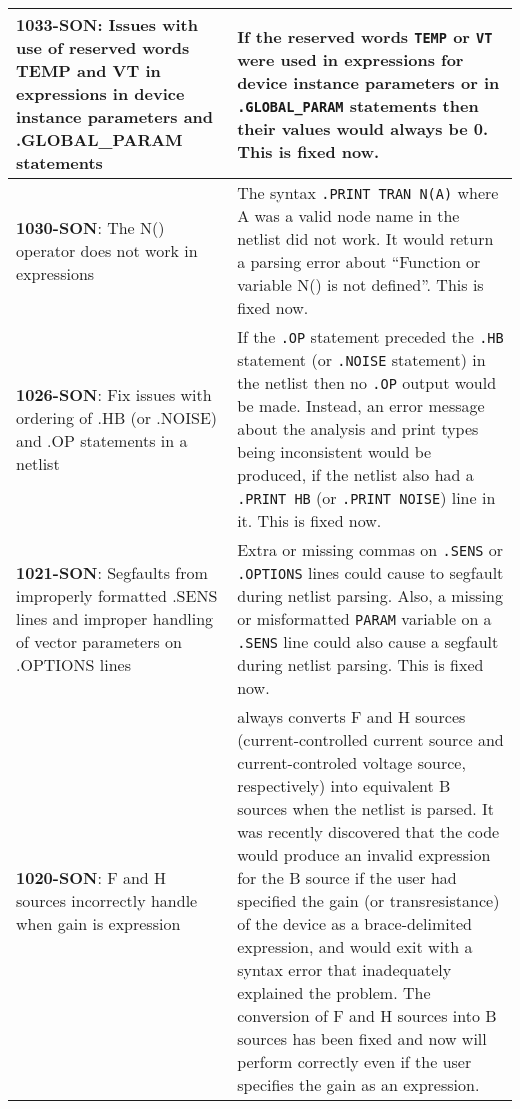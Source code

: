 {\begin{longtable}[h] {>{\raggedright\small}m{2in}|>{\raggedright\let\\\tabularnewline\small}m{3.5in}}
     \textbf{1033-SON}: Issues with use of reserved words TEMP and VT
     in expressions in device instance parameters and .GLOBAL\_PARAM
     statements & If the reserved words \texttt{TEMP} or \texttt{VT}
     were used in expressions for device instance parameters or
     in \texttt{.GLOBAL\_PARAM} statements then their values would
     always be 0.  This is fixed now.  \\ \hline

     \textbf{1030-SON}: The N() operator does not work in expressions &
     The syntax \texttt{.PRINT TRAN {N(A)}} where A was a valid
     node name in the netlist did not work.  It would return a 
     parsing error about ``Function or variable N() is not defined''.  
     This is fixed now.  \\ \hline

     \textbf{1026-SON}: Fix issues with ordering of .HB (or .NOISE) 
     and .OP statements in a netlist &  If the \texttt{.OP} statement 
     preceded the \texttt{.HB} statement (or \texttt{.NOISE} statement) 
     in the netlist then no \texttt{.OP} output would be made.  Instead, 
     an error message about the analysis and print types being 
     inconsistent would be produced, if the netlist also had a 
     \texttt{.PRINT HB} (or \texttt{.PRINT NOISE}) line in it. This is 
     fixed now.   \\ \hline

     \textbf{1021-SON}: Segfaults from improperly formatted .SENS
     lines and improper handling of vector parameters on .OPTIONS
     lines &  Extra or missing commas on \texttt{.SENS} or 
     \texttt{.OPTIONS} lines could cause \Xyce{}  to segfault during 
     netlist parsing.  Also, a missing or misformatted \texttt{PARAM} 
     variable on a \texttt{.SENS} line could also cause a segfault 
     during netlist parsing.  This is fixed now. \\ \hline

     \textbf{1020-SON}: F and H sources incorrectly handle when gain
     is expression & \Xyce{} always converts F and H sources
     (current-controlled current source and current-controled voltage
     source, respectively) into equivalent B sources when the netlist
     is parsed.  It was recently discovered that the code would
     produce an invalid expression for the B source if the user had
     specified the gain (or transresistance) of the device as a
     brace-delimited expression, and \Xyce{} would exit with a syntax
     error that inadequately explained the problem.  The conversion of
     F and H sources into B sources has been fixed and now \Xyce{}
     will perform correctly even if the user specifies the gain as an
     expression.\\ \hline


\end{longtable}}
